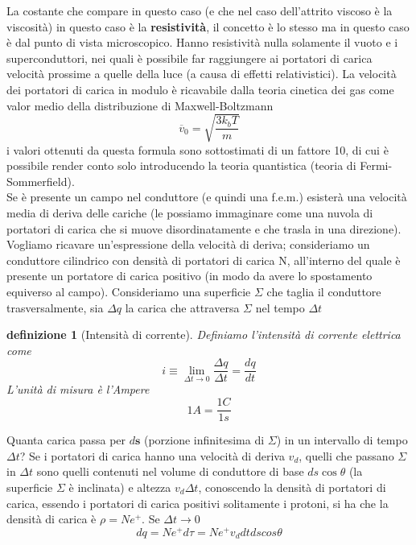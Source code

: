 \documentclass[10pt,a4paper]{article}
\newtheorem{definizione}{definizione}
\begin{document}
La costante che compare in questo caso (e che nel caso dell'attrito viscoso è la viscosità) in questo caso è la \textbf{resistività}, il concetto è lo stesso ma in questo caso è dal punto di vista microscopico. Hanno resistività nulla solamente il vuoto e i superconduttori, nei quali è possibile far raggiungere ai portatori di carica velocità prossime a quelle della luce (a causa di effetti relativistici). La velocità dei portatori di carica in modulo è ricavabile dalla teoria cinetica dei gas come valor medio della distribuzione di Maxwell-Boltzmann
\[\overline{v}_0=\sqrt{\frac{3k_b T}{m}}\]
i valori ottenuti da questa formula sono sottostimati di un fattore 10, di cui è possibile render conto solo introducendo la teoria quantistica (teoria di Fermi-Sommerfield).\\
Se è presente un campo nel conduttore (e quindi una f.e.m.) esisterà una velocità media di deriva delle cariche (le possiamo immaginare come una nuvola di portatori di carica che si muove disordinatamente e che trasla in una direzione). Vogliamo ricavare un'espressione della velocità di deriva; consideriamo un conduttore cilindrico con densità di portatori di carica N, all'interno del quale è presente un portatore di carica positivo (in modo da avere lo spostamento equiverso al campo). Consideriamo una superficie \(\Sigma\) che taglia il conduttore trasversalmente, sia $\Delta q$ la carica che attraversa $\Sigma$ nel tempo $\Delta t$
\begin{definizione}[Intensità di corrente]
	Definiamo l'intensità di corrente elettrica come
	\[i \equiv \lim_{\Delta t \to 0} \frac{\Delta q}{\Delta t}=\frac{dq}{dt}\]
	L'unità di misura è l'Ampere
	\[1 A = \frac{1 C}{1 s}\]
\end{definizione}
Quanta carica passa per \(d\mathbf{s}\) (porzione infinitesima di $\Sigma$) in un intervallo di tempo $\Delta t$? Se i portatori di carica hanno una velocità di deriva \(v_d\), quelli che passano $\Sigma$ in $\Delta t$ sono quelli contenuti nel volume di conduttore di base \(ds\cos\theta\) (la superficie $\Sigma$ è inclinata) e altezza $v_d\Delta t$, conoscendo la densità di portatori di carica, essendo i portatori di carica positivi solitamente i protoni, si ha che la densità di carica è \(\rho = N e^+\). Se $\Delta t \to 0$
\[dq = N e^+ d\tau = N e^+ v_d dt ds cos\theta\]
\end{document}
